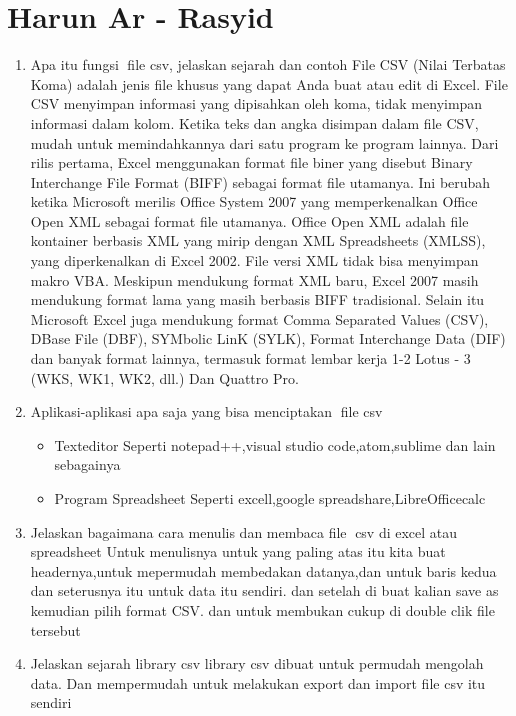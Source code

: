 \section{Harun Ar - Rasyid}
\begin{enumerate}
    \item Apa itu fungsi file csv, jelaskan sejarah dan contoh
    File CSV (Nilai Terbatas Koma) adalah jenis file khusus yang dapat Anda buat atau edit di Excel. File CSV menyimpan informasi yang dipisahkan oleh koma, tidak menyimpan informasi dalam kolom. Ketika teks dan angka disimpan dalam file CSV, mudah untuk memindahkannya dari satu program ke program lainnya.
    Dari rilis pertama, Excel menggunakan format file biner yang disebut Binary Interchange File Format (BIFF) sebagai format file utamanya. Ini berubah ketika Microsoft merilis Office System 2007 yang memperkenalkan Office Open XML sebagai format file utamanya. Office Open XML adalah file kontainer berbasis XML yang mirip dengan XML Spreadsheets (XMLSS), yang diperkenalkan di Excel 2002. File versi XML tidak bisa menyimpan makro VBA.
    Meskipun mendukung format XML baru, Excel 2007 masih mendukung format lama yang masih berbasis BIFF tradisional. Selain itu Microsoft Excel juga mendukung format Comma Separated Values (CSV), DBase File (DBF), SYMbolic LinK (SYLK), Format Interchange Data (DIF) dan banyak format lainnya, termasuk format lembar kerja 1-2 Lotus - 3 (WKS, WK1, WK2, dll.) Dan Quattro Pro.
    \item Aplikasi-aplikasi apa saja yang bisa menciptakan file csv
    \begin{itemize}
        \item Texteditor
        Seperti notepad++,visual studio code,atom,sublime dan lain sebagainya
        \item Program Spreadsheet
        Seperti excell,google spreadshare,LibreOfficecalc
    \end{itemize}
    \item Jelaskan bagaimana cara menulis dan membaca file csv di excel atau spreadsheet
    Untuk menulisnya untuk yang paling atas itu kita buat headernya,untuk mepermudah membedakan datanya,dan untuk baris kedua dan seterusnya itu untuk data itu sendiri.
    dan setelah di buat kalian save as kemudian pilih format CSV.
    dan untuk membukan cukup di double clik file tersebut
    \item Jelaskan sejarah library csv
    library csv dibuat untuk permudah mengolah data. Dan mempermudah untuk melakukan export dan import file csv itu sendiri

\end{enumerate}
